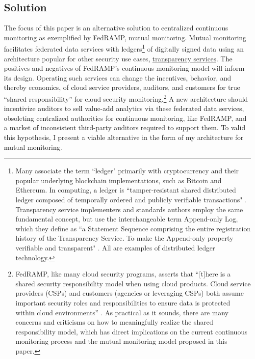 \documentclass{jdf}
\begin{document}
\subsection{Solution}

The focus of this paper is an alternative solution to centralized continuous monitoring as exemplified by FedRAMP, mutual monitoring. Mutual monitoring facilitates federated data services with ledgers\footnote{Many associate the term ``ledger" primarily with cryptocurrency and their popular underlying blockchain implementations, such as Bitcoin and Ethereum. In computing, a ledger is ``tamper-resistant shared distributed ledger composed of temporally ordered and publicly verifiable transactions" \cite{bashir22}. Transparency service implementers and standards authors employ the same fundamental concept, but use the interchangeable term Append-only Log, which they define as ``a Statement Sequence comprising the entire registration history of the Transparency Service. To make the Append-only property verifiable and transparent" \cite{scitt25}. All are examples of distributed ledger technology.} of digitally signed data using an architecture popular for other security use cases, \hyperlink{https://transparency.dev}{transparency services}. The positives and negatives of FedRAMP's continuous monitoring model will inform its design. Operating such services can change the incentives, behavior, and thereby economics, of cloud service providers, auditors, and customers for true ``shared responsibility'' for cloud security monitoring.\footnote{FedRAMP, like many cloud security programs, asserts that ``[t]here is a shared security responsibility model when using cloud products. Cloud service providers (CSPs) and customers (agencies or leveraging CSPs) both assume important security roles and responsibilities to ensure data is protected within cloud environments'' \citeyear{fedramp_srm25}. As practical as it sounds, there are many concerns and criticisms on how to meaningfully realize the shared responsibility model, which has direct implications on the current continuous monitoring process and the mutual monitoring model proposed in this paper.} A new architecture should incentivize auditors to sell value-add analytics via these federated data services, obsoleting centralized authorities for continuous monitoring, like FedRAMP, and a market of inconsistent third-party auditors required to support them. To valid this hypothesis, I present a viable alternative in the form of my architecture for mutual monitoring.
\end{document}
